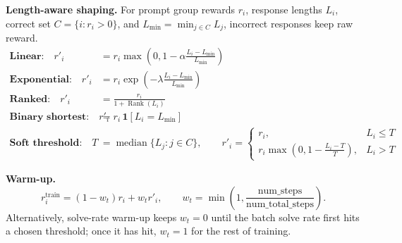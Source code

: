 \documentclass[border=8pt]{standalone}
\begin{document}
\begin{minipage}{6.8in}
\color{textdark}
\large
\textbf{\color{uwpurple} Length-aware shaping.}
For prompt group rewards $r_i$, response lengths $L_i$, correct set
$C=\{i:r_i>0\}$, and $L_{\min}=\min_{j\in C} L_j$, incorrect responses keep raw reward.
\[
\begin{aligned}
\textbf{Linear:}\quad
r'_i &= r_i\max\!\left(0,1-\alpha\frac{L_i-L_{\min}}{L_{\min}}\right) \\[2mm]
\textbf{Exponential:}\quad
r'_i &= r_i\exp\!\left(-\lambda\frac{L_i-L_{\min}}{L_{\min}}\right) \\[2mm]
\textbf{Ranked:}\quad
r'_i &= \frac{r_i}{1+\operatorname{Rank}(L_i)} \\[2mm]
\textbf{Binary shortest:}\quad
r'_i &= r_i\,\mathbf{1}[L_i=L_{\min}] \\[2mm]
\textbf{Soft threshold:}\quad
T &= \operatorname{median}\{L_j:j\in C\},\qquad
r'_i =
\begin{cases}
r_i, & L_i\le T\\
r_i\max\!\left(0,1-\frac{L_i-T}{T}\right), & L_i>T
\end{cases}
\end{aligned}
\]
\vspace{1mm}

\textbf{\color{uwpurple} Warm-up.}
\[
r_i^{\mathrm{train}}=(1-w_t)r_i+w_t r'_i,\qquad
w_t=\min\!\left(1,\frac{\text{num\_steps}}{\text{num\_total\_steps}}\right).
\]
Alternatively, solve-rate warm-up keeps $w_t=0$ until the batch solve rate first
hits a chosen threshold; once it has hit, $w_t=1$ for the rest of training.
\end{minipage}
\end{document}
